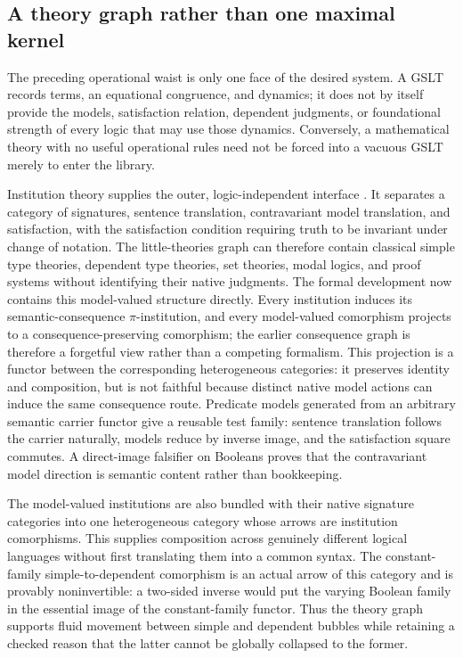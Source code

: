 \documentclass[11pt]{article}
\theoremstyle{definition}
\theoremstyle{remark}
\begin{document}
\subsection{A theory graph rather than one maximal kernel}

The preceding operational waist is only one face of the desired system.  A
GSLT records terms, an equational congruence, and dynamics; it does not by
itself provide the models, satisfaction relation, dependent judgments, or
foundational strength of every logic that may use those dynamics.  Conversely,
a mathematical theory with no useful operational rules need not be forced into
a vacuous GSLT merely to enter the library.

Institution theory supplies the outer, logic-independent interface
\cite{GoguenBurstallInstitutions}.  It separates a category of signatures,
sentence translation, contravariant model translation, and satisfaction, with
the satisfaction condition requiring truth to be invariant under change of
notation.  The little-theories graph can therefore contain classical simple
type theories, dependent type theories, set theories, modal logics, and proof
systems without identifying their native judgments.  The formal development
now contains this model-valued structure directly.  Every institution induces
its semantic-consequence $\pi$-institution, and every model-valued comorphism
projects to a consequence-preserving comorphism; the earlier consequence graph
is therefore a forgetful view rather than a competing formalism.  This
projection is a functor between the corresponding heterogeneous categories:
it preserves identity and composition, but is not faithful because distinct
native model actions can induce the same consequence route.  Predicate
models generated from an arbitrary semantic carrier functor give a reusable
test family: sentence translation follows the carrier naturally, models reduce
by inverse image, and the satisfaction square commutes.  A direct-image
falsifier on Booleans proves that the contravariant model direction is semantic
content rather than bookkeeping.

The model-valued institutions are also bundled with their native signature
categories into one heterogeneous category whose arrows are institution
comorphisms.  This supplies composition across genuinely different logical
languages without first translating them into a common syntax.  The
constant-family simple-to-dependent comorphism is an actual arrow of this
category and is provably noninvertible: a two-sided inverse would put the
varying Boolean family in the essential image of the constant-family functor.
Thus the theory graph supports fluid movement between simple and dependent bubbles
while retaining a checked reason that the latter cannot be globally collapsed
to the former.
\end{document}
